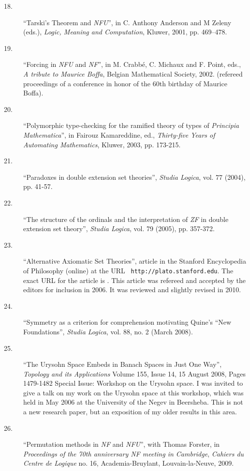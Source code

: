 \begin{description}
\begin{description}
\item[18.]  ``Tarski's Theorem and {\em NFU\/}'', in C. Anthony
Anderson and M Zeleny (eds.), {\em Logic, Meaning and Computation\/},
Kluwer, 2001, pp. 469--478.

\item[19.]  ``Forcing in {\em NFU\/} and {\em NF\/}'', in M. Crabb\'e,
C. Michaux and F. Point, eds., {\em A tribute to Maurice Boffa\/},
Belgian Mathematical Society, 2002.  (refereed proceedings of a
conference in honor of the 60th birthday of Maurice Boffa).

\item[20.]  ``Polymorphic type-checking for the ramified theory of
types of {\em Principia Mathematica\/}'', in Fairouz Kamareddine, ed.,
{\em Thirty-five Years of Automating Mathematics\/}, Kluwer, 2003,
pp. 173-215.

\item[21.]  ``Paradoxes in double extension set theories'', {\em Studia Logica\/}, vol. 77 (2004), pp. 41-57.

\item[22.]  ``The structure of the ordinals and the interpretation of
{\em ZF\/} in double extension set theory'', {\em Studia
Logica\/}, vol. 79 (2005), pp. 357-372.

\item[23.] ``Alternative Axiomatic Set Theories'', article in the
Stanford Encyclopedia of Philosophy (online) at the URL {\tt
http://plato.stanford.edu}.  The exact URL for the article is .  This
article was refereed and accepted by the editors for inclusion in
2006.  It was reviewed and slightly revised in 2010.

\item[24.] ``Symmetry as a criterion for comprehension motivating
Quine's ``New Foundations'', {\em Studia Logica\/}, vol. 88, no. 2
(March 2008).

\item[25.] ``The Urysohn Space Embeds in Banach Spaces in Just One
Way'', {\em Topology and its Applications\/} Volume 155, Issue 14, 15
August 2008, Pages 1479-1482 Special Issue: Workshop on the Urysohn
space.  I was invited to give a talk on my work on the Urysohn space
at this workshop, which was held in May 2006 at the University of the
Negev in Beersheba.  This is not a new research paper, but an
exposition of my older results in this area.

\item[26.] ``Permutation methods in {\em NF\/} and {\em NFU\/}'', with
Thomas Forster, in {\em Proceedings of the 70th anniversary NF meeting
in Cambridge\/}, {\em Cahiers du Centre de Logique\/} no. 16,
Academia-Bruylant, Louvain-la-Neuve, 2009.


\end{description}
\end{description}
